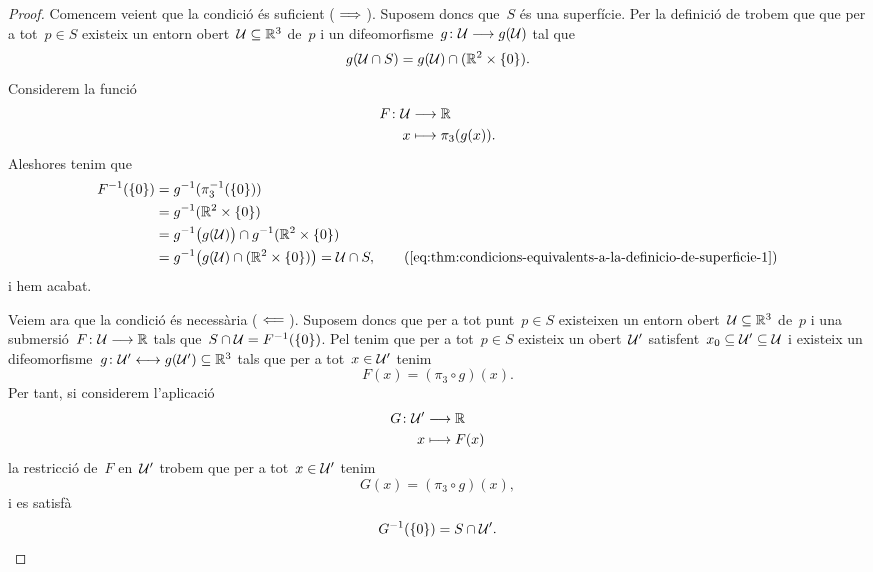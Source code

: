 \documentclass[../../main.tex]{subfiles}
\begin{document}
    \begin{proof}
        Comencem veient que la condició és suficient (\(\implies\)).
        Suposem doncs que~\(S\) és una superfície.
        Per la definició de  trobem que que per a tot~\(p\in S\) existeix un entorn obert~\(\mathcal{U}\subseteq\mathbb{R}^{3}\) de~\(p\) i un difeomorfisme~\(g\colon\mathcal{U}\longrightarrow g(\mathcal{U})\) tal que
        \begin{equation}
            \label{eq:thm:condicions-equivalents-a-la-definicio-de-superficie-1}
            g(\mathcal{U}\cap S)=g(\mathcal{U})\cap(\mathbb{R}^{2}\times\{0\}).
        \end{equation}
        Considerem la funció
        \begin{align*}
            F\colon\mathcal{U}&\longrightarrow\mathbb{R} \\
            x&\longmapsto\pi_{3}(g(x)).
        \end{align*}
        Aleshores tenim que
        \begin{align*}
            F^{-1}(\{0\})&=g^{-1}(\pi_{3}^{-1}(\{0\})) \\
            &=g^{-1}(\mathbb{R}^{2}\times\{0\}) \\
            &=g^{-1}\big(g(\obert{U})\big)\cap g^{-1}(\mathbb{R}^{2}\times\{0\})\\
            &=g^{-1}\big(g(\obert{U})\cap(\mathbb{R}^{2}\times\{0\})\big)=\obert{U}\cap S, \tag{\ref{eq:thm:condicions-equivalents-a-la-definicio-de-superficie-1}} %
        \end{align*}
        i hem acabat.

        Veiem ara que la condició és necessària (\(\impliedby\)).
        Suposem doncs que per a tot punt~\(p\in S\) existeixen un entorn obert~\(\mathcal{U}\subseteq\mathbb{R}^{3}\) de~\(p\) i una submersió~\(F\colon\mathcal{U}\longrightarrow\mathbb{R}\) tals que~\(S\cap\mathcal{U}=F^{-1}(\{0\})\).
        Pel  tenim que per a tot~\(p\in S\) existeix un obert~\(\mathcal{U}'\) satisfent~\(x_{0}\subseteq\mathcal{U}'\subseteq\mathcal{U}\) i existeix un difeomorfisme~\(g\colon\mathcal{U}'\longleftrightarrow g(\mathcal{U}')\subseteq\mathbb{R}^{3}\) tals que per a tot~\(x\in\mathcal{U}'\) tenim
        \[
            F(x)=(\pi_{3}\circ g)(x).
        \]
        Per tant, si considerem l'aplicació
        \begin{align*}
            G\colon\mathcal{U}'&\longrightarrow\mathbb{R} \\
            x&\longmapsto F(x)
        \end{align*}
        la restricció de~\(F\) en~\(\mathcal{U}'\) trobem que per a tot~\(x\in\mathcal{U}'\) tenim
        \[
            G(x)=(\pi_{3}\circ g)(x),
        \]
        i es satisfà
        \begin{equation}
            \label{eq:thm:condicions-equivalents-a-la-definicio-de-superficie-2}
            G^{-1}(\{0\})=S\cap\mathcal{U}'.
        \end{equation}


\end{proof}
\end{document}
